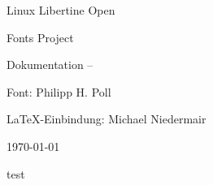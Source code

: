 \documentclass{fontdoku}
\begin{document}
\thispagestyle{empty}

\begin{minipage}{\linewidth}%
   \centering%
   \libertine\fontsize{36pt}{40pt}\selectfont%
   \textcolor{red}{}\quad%
   \fontsize{36pt}{40pt}\selectfont Linux Libertine Open\par
   \hfill\fontsize{36pt}{40pt}\selectfont Fonts Project\quad%
   \fontsize{36pt}{40pt}\selectfont\textcolor{red}{%
   }\par
\end{minipage}

\vfill
\begin{center}
   \fontsize{46pt}{46pt}\selectfont%
   Dokumentation -- \XeLaTeX
\end{center}

\vfill
\begin{center}\fontsize{20pt}{18pt}\selectfont
Font: Philipp H. Poll\par \LaTeX-Einbindung: Michael Niedermair
\end{center}

\vfill
\begin{center}
\hfill\fontsize{20pt}{18pt}\selectfont\today
\end{center}
\newpage



test
\end{document}
